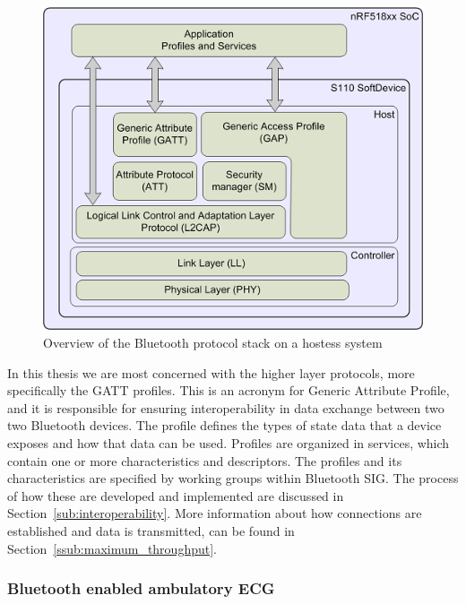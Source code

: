 \begin{figure}[H]
\centering
\includegraphics[scale=.8]{img/figures/bleNordicHost.png}
\caption{Overview of the Bluetooth protocol stack on a hostess system~\cite{nordicSDK}}
\label{fig:bleNordicHost}
\end{figure}


\noindent
In this thesis we are most concerned with the higher layer protocols, more specifically the GATT profiles. This is an acronym for Generic Attribute Profile, and it is responsible for ensuring interoperability in data exchange between two two Bluetooth devices. The profile defines the types of state data that a device exposes and how that data can be used. Profiles are organized in services, which contain one or more characteristics and descriptors. The profiles and its characteristics are specified by working groups within Bluetooth SIG. The process of how these are developed and implemented are discussed in Section~\ref{sub:interoperability}. More information about how connections are established and data is transmitted, can be found in Section~\ref{ssub:maximum_throughput}.


\subsubsection{Bluetooth enabled ambulatory ECG} %
\label{ssub:bluetooth_enabled_ambulatory_ecg}

